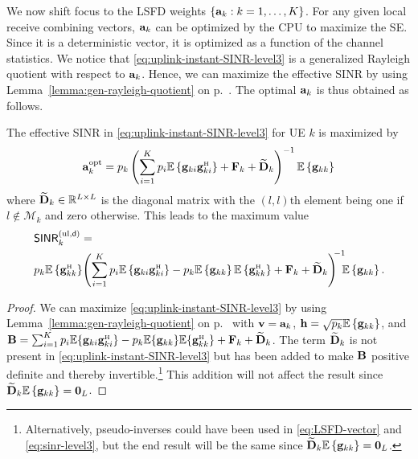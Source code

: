We now shift focus to the LSFD weights $\{ \mathbf{a}_{k} : k = 1,\ldots,K\}$. For any given local receive combining vectors, $\mathbf{a}_{k}$ can be optimized by the CPU to maximize the SE. Since it is a deterministic vector, it is optimized as a function of the channel statistics.
We notice that \eqref{eq:uplink-instant-SINR-level3} is a generalized Rayleigh quotient with respect to $\mathbf{a}_k$. Hence, we can maximize the effective SINR by using Lemma~\ref{lemma:gen-rayleigh-quotient} on p.~\pageref{lemma:gen-rayleigh-quotient}.
The optimal $\mathbf{a}_{k}$ is thus obtained as follows.
\begin{corollary} \label{cor:LSFD-optimal}
	The effective SINR in \eqref{eq:uplink-instant-SINR-level3} for UE $k$ is maximized by
		\begin{equation} \label{eq:LSFD-vector}
	{\vect{a}}_{k}^{\rm opt} = p_k  \left( \sum\limits_{i=1}^{K}
	p_{i} \mathbb{E} \left\{ {\vect{g}}_{ki} {\vect{g}}_{ki}^{\Htran} \right\} +  {\vect{F}}_{k} + \widetilde{\vect{D}}_k  \right)^{-1} \mathbb{E}\left\{ {\vect{g}}_{kk}\right\}
	\end{equation}
	where $\widetilde{\mathbf{D}}_k\in\mathbb{R}^{L\times L}$ is the diagonal matrix with the $(l,l)$th element being  one if $l\notin\mathcal{M}_k$ and zero otherwise. This leads to the maximum value
	\begin{align} \nonumber
	&\mathacr{SINR}_{k}^{({\rm ul},\dist)} =
	\\ &p_{k}  \mathbb{E}\left\{ {\vect{g}}_{kk}^{\Htran}\right\} \! \left( \sum\limits_{i=1}^{K}
	p_{i} \mathbb{E} \left\{ {\vect{g}}_{ki} {\vect{g}}_{ki}^{\Htran} \right\} -p_k \mathbb{E}\left\{ {\vect{g}}_{kk}\right\}\mathbb{E}\left\{ {\vect{g}}_{kk}^{\Htran}\right\}+ {\vect{F}}_{k}+\widetilde{\vect{D}}_k  \right)^{\!\!-1}\!\!\!\mathbb{E}\left\{ {\vect{g}}_{kk}\right\} . \label{eq:sinr-level3}
	\end{align}
\end{corollary}
\begin{proof}
We can maximize \eqref{eq:uplink-instant-SINR-level3} by using Lemma~\ref{lemma:gen-rayleigh-quotient} on p.~\pageref{lemma:gen-rayleigh-quotient} with $\mathbf{v} = \mathbf{a}_{k}$, $\mathbf{h} = \sqrt{p_{k}} \mathbb{E}\left\{ {\mathbf{g}}_{kk}\right\}$, and $\vect{B} = \sum_{i=1}^{K} p_{i} \mathbb{E} \{  \vect{g}_{ki} \vect{g}_{ki}^{\Htran}  \} - p_{k}  \mathbb{E}\{ \vect{g}_{kk}\} \mathbb{E}\{ \vect{g}_{kk}^{\Htran}\} + 
		\vect{F}_{k} + \widetilde{\vect{D}}_k$.  The term $\widetilde{\mathbf{D}}_k$ is not present in \eqref{eq:uplink-instant-SINR-level3} but has been added to make $\mathbf{B}$ positive definite and thereby invertible.\footnote{Alternatively, pseudo-inverses could have been used in \eqref{eq:LSFD-vector} and \eqref{eq:sinr-level3}, but the end result will be the same since $\widetilde{\mathbf{D}}_k \mathbb{E}\left\{ {\mathbf{g}}_{kk}\right\} = \mathbf{0}_L$.} This addition will not affect the result since $\widetilde{\mathbf{D}}_k \mathbb{E}\left\{ {\mathbf{g}}_{kk}\right\} = \mathbf{0}_L$. 
\end{proof}

